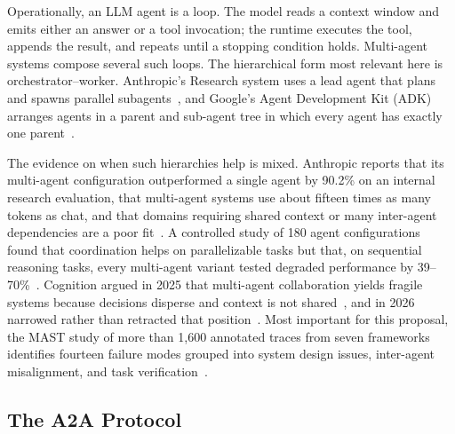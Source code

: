 \documentclass[conference,letterpaper]{IEEEtran}
\begin{document}
Operationally, an LLM agent is a loop. The model reads a context window and
emits either an answer or a tool invocation; the runtime executes the tool,
appends the result, and repeats until a stopping condition holds.
Multi-agent systems compose several such loops. The hierarchical form most
relevant here is orchestrator--worker. Anthropic's Research system uses a
lead agent that plans and spawns parallel subagents~\cite{anthropic2025},
and Google's Agent Development Kit (ADK) arranges agents in a parent and
sub-agent tree in which every agent has exactly one parent~\cite{adk-multi}.

The evidence on when such hierarchies help is mixed. Anthropic reports that
its multi-agent configuration outperformed a single agent by 90.2\% on an
internal research evaluation, that multi-agent systems use about fifteen
times as many tokens as chat, and that domains requiring shared context or
many inter-agent dependencies are a poor fit~\cite{anthropic2025}. A
controlled study of 180 agent configurations found that coordination helps
on parallelizable tasks but that, on sequential reasoning tasks, every
multi-agent variant tested degraded performance by 39--70\%~\cite{kim2025}.
Cognition argued in 2025 that multi-agent collaboration yields fragile
systems because decisions disperse and context is not
shared~\cite{yan2025}, and in 2026 narrowed rather than retracted that
position~\cite{yan2026}. Most important for this proposal, the MAST study of
more than 1{,}600 annotated traces from seven frameworks identifies fourteen
failure modes grouped into system design issues, inter-agent misalignment,
and task verification~\cite{cemri2025}.

\subsection{The A2A Protocol}
\end{document}
